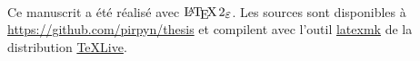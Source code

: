 ~{}

Ce manuscrit a été réalisé avec \(\LaTeXe\). Les sources sont disponibles à \url{https://github.com/pirpyn/thesis} et compilent avec l'outil \href{https://mg.readthedocs.io/latexmk.html}{latexmk} de la distribution \href{https://tug.org/texlive}{TeXLive}.
